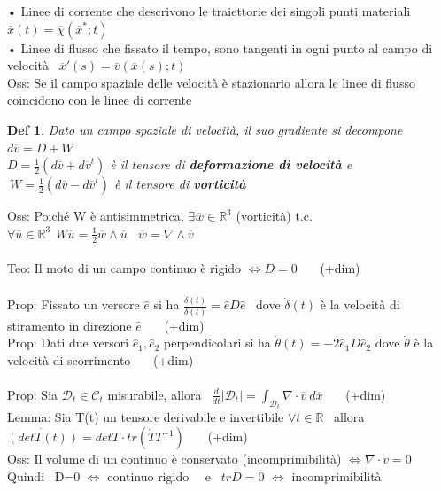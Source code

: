 \documentclass{article}
\theoremstyle{unnumbered}
\newtheorem* {theoremT}{Def}
\theoremstyle{unnumbered1}
\newenvironment{defi}{\begin{gBox}\begin{theoremT}}{\end{theoremT}\end{gBox}}
\begin{document}
\phantom{Oss: }• Linee di corrente che descrivono le traiettorie dei singoli punti materiali \ \ $\overline{x}(t)=\overline{\chi}(\overline{x}^*;t)$ \\
\phantom{Oss: }• Linee di flusso che fissato il tempo, sono tangenti in ogni punto al campo di velocità \ $\overline{x}'(s)=\overline{v}(\overline{x}(s);t)$\\
%
Oss: Se il campo spaziale delle velocità è stazionario allora le linee di flusso coincidono con le linee di corrente \\
%
%
%
\begin{defi}
Dato un campo spaziale di velocità, il suo gradiente si decompone \ $d\overline{v}=D+W$\\
$D=\frac{1}{2}(d\overline{v}+d\overline{v}^t)$ è il tensore di \textbf{deformazione di velocità} e $ \ W=\frac{1}{2}(d\overline{v}-d\overline{v}^t)$ è il tensore di \textbf{vorticità}
%
\end{defi}
Oss: Poiché W è antisimmetrica, $\exists \overline{w}\in \mathbb{R}^3$ (vorticità) t.c. $\forall \overline{u}\in\mathbb{R}^3 \ \ W\overline{u}=\frac{1}{2}\overline{w}\wedge\overline{u} \ \ \ \ \overline{w}=\nabla\wedge\overline{v}$\\ \\
%
%
%
Teo: Il moto di un campo continuo è rigido $\Longleftrightarrow D=0$ \ \ \ (+dim)\\ \\
%
%
%
Prop: Fissato un versore $\hat{e}$ si ha $\frac{\dot{\delta}(t)}{\delta(t)}=\hat{e}D\hat{e}$ \ dove $\dot{\delta}(t)$ è la velocità di stiramento in direzione $\hat{e}$ \ \ \ (+dim)\\
%
%
%
Prop: Dati due versori $\hat{e}_1, \hat{e}_2$ perpendicolari si ha $\dot{\theta}(t)=-2\hat{e}_1D\hat{e}_2$ dove $\dot{\theta}$ è la velocità di scorrimento \ \ \ (+dim) \\ \\
%
%
%
Prop: Sia $\mathcal{D}_t\in\mathcal{C}_t$ misurabile, allora \ $\frac{d}{dt}|\mathcal{D}_t|=\int_{\mathcal{D}_t}\nabla\cdot\overline{v}\ d\overline{x}$ \ \ \ (+dim)\\
%
Lemma: Sia T(t) un tensore derivabile e invertibile $\forall t \in \mathbb{R}$ \ allora $\dot{(det T(t))} = det T\cdot tr(\dot{T}T^{-1})$ \ \ \ (+dim)\\
%
Oss: Il volume di un continuo è conservato (incomprimibilità) $\Leftrightarrow \nabla\cdot\overline{v}=0$ \\
\phantom{Oss: } Quindi \ D=0 $\Leftrightarrow$ continuo rigido \ \ e \ $trD=0$ $\Leftrightarrow$ incomprimibilità\\ \\
\end{document}
